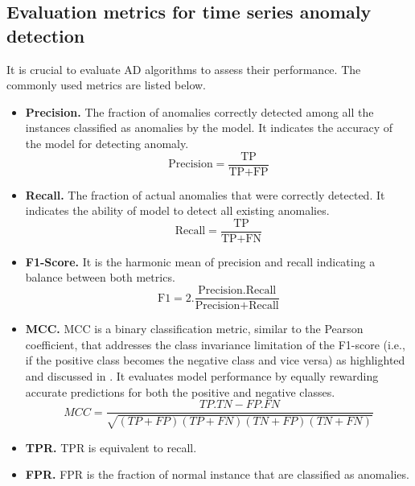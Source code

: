 

\subsection{Evaluation metrics for time series anomaly detection}
It is crucial to evaluate AD algorithms to assess their performance. The commonly used metrics are listed below.

\begin{itemize}
    \item \textbf{Precision.} The fraction of anomalies correctly detected among all the instances classified as anomalies by the model. It indicates the accuracy of the model for detecting anomaly.
    \begin{equation}\label{eq:precision}
        \text{Precision} = \frac{\text{TP}}{\text{TP} + \text{FP}}
    \end{equation}
    \item \textbf{Recall.} The fraction of actual anomalies that were correctly detected. It indicates the ability of model to detect all existing anomalies.
    \begin{equation}\label{eq:recall}
        \text{Recall} = \frac{\text{TP}}{\text{TP} + \text{FN}}
    \end{equation}
    \item \textbf{F1-Score.} It is the harmonic mean of precision and recall indicating a balance between both metrics.
    \begin{equation}\label{eq:f1}
        \text{F1} = 2 . \frac{\text{Precision} . \text{Recall}}{\text{Precision} + \text{Recall}}
    \end{equation}
    \item \textbf{MCC.} \ac{MCC} \cite{Matthews1975ComparisonOT} is a binary classification metric, similar to the Pearson coefficient, that addresses the class invariance limitation of the F1-score (i.e., if the positive class becomes the negative class and vice versa) as highlighted and discussed in  \cite{Chicco2020TheAO}. It evaluates model performance by equally rewarding accurate predictions for both the positive and negative classes.
    \begin{equation}\label{eq:mcc}
        MCC = \frac{TP . TN - FP . FN}{\sqrt{(TP+FP)(TP+FN)(TN+FP)(TN+FN)}}
    \end{equation}
    \item \textbf{TPR.} \ac{TPR} is equivalent to recall.
    \item \textbf{FPR.} \ac{FPR} is the fraction of normal instance that are classified as anomalies.

\end{itemize}

